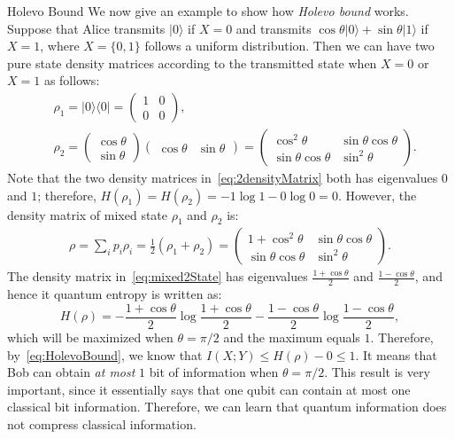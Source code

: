 \begin{subsection}{Holevo Bound}
We now give an example to show how {\it{Holevo bound}} works.
Suppose that Alice transmits $|0\rangle$ if $X=0$ and transmits $\cos \theta |0\rangle + \sin \theta |1\rangle$ if $X=1$, where $X=\{0,1\}$ follows a uniform distribution.
Then we can have two pure state density matrices according to the transmitted state when $X=0$ or $X=1$ as follows:
\begin{align}\label{eq:2densityMatrix}
&\rho_1 = |0\rangle \langle 0| = \begin{pmatrix} 1 &0 \\ 0 &0 \end{pmatrix}, \nonumber \\
&\rho_2 = \begin{pmatrix} \cos \theta \\ \sin \theta \end{pmatrix}
         \begin{pmatrix} \cos \theta & \sin \theta \end{pmatrix} = 
         \begin{pmatrix} \cos^2 \theta &\sin \theta \cos \theta \\
         \sin \theta \cos \theta &\sin^2 \theta \end{pmatrix}.
\end{align}
Note that the two density matrices in~\eqref{eq:2densityMatrix} both has eigenvalues $0$ and $1$; therefore, ${H(\rho_1) = H(\rho_2) = -1\log 1 - 0\log 0 = 0}$.
However, the density matrix of mixed state $\rho_1$ and $\rho_2$ is:
\begin{align}\label{eq:mixed2State}
\rho = \sum_i p_i \rho_i = \frac{1}{2}(\rho_1 + \rho_2) = 
\begin{pmatrix} 1+\cos^2 \theta &\sin \theta \cos \theta \\
 \sin \theta \cos \theta &\sin^2 \theta \end{pmatrix}.
\end{align}
The density matrix in~\eqref{eq:mixed2State} has eigenvalues $\frac{1+\cos \theta}{2}$ and $\frac{1-\cos \theta}{2}$, and hence it quantum entropy is written as: 
\begin{equation}
H(\rho) = -\frac{1+\cos \theta}{2} \log \frac{1+\cos \theta}{2} - \frac{1-\cos \theta}{2} \log \frac{1-\cos \theta}{2},
\end{equation}
which will be maximized when $\theta = \pi /2$ and the maximum equals $1$.
Therefore, by~\eqref{eq:HolevoBound}, we know that $I(X;Y) \leq H(\rho)-0 \leq 1$.
It means that Bob can obtain \textit{at most} $1$ bit of information when $\theta = \pi /2$.
This result is very important, since it essentially says that one qubit can contain at most one classical bit information.
Therefore, we can learn that quantum information does not compress classical information.
\end{subsection}
